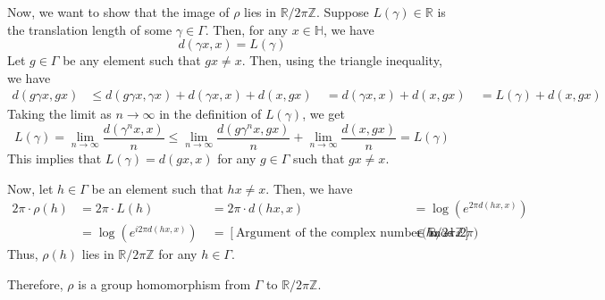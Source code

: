 \documentclass[12pt,a4paper,english]{article}
\theoremstyle{plain}
\theoremstyle{definition}
\theoremstyle{remark}
\begin{document}
Now, we want to show that the image of $\rho$ lies in $\mathbb{R}/2\pi\mathbb{Z}$. Suppose $L(\gamma) \in \mathbb{R}$ is the translation length of some $\gamma \in \Gamma$. Then, for any $x \in \mathbb{H}$, we have $$d(\gamma x, x) = L(\gamma)$$ Let $g \in \Gamma$ be any element such that $gx \neq x$. Then, using the triangle inequality, we have \begin{align} d(g\gamma x, gx) &\leq d(g\gamma x, \gamma x) + d(\gamma x, x) + d(x, gx) \ &= d(\gamma x, x) + d(x, gx) \ &= L(\gamma) + d(x, gx) \end{align} Taking the limit as $n \to \infty$ in the definition of $L(\gamma)$, we get $$L(\gamma) = \lim_{n \to \infty} \frac{d(\gamma^n x, x)}{n} \leq \lim_{n \to \infty} \frac{d(g\gamma^n x, gx)}{n} + \lim_{n \to \infty} \frac{d(x, gx)}{n} = L(\gamma)$$ This implies that $L(\gamma) = d(gx, x)$ for any $g \in \Gamma$ such that $gx \neq x$.

Now, let $h \in \Gamma$ be an element such that $hx \neq x$. Then, we have \begin{align} 2\pi \cdot \rho(h) &= 2\pi \cdot L(h) \ &= 2\pi \cdot d(hx, x) \ &= \log(e^{2\pi d(hx,x)}) \\
&= \log(e^{i2\pi d(hx,x)}) \ &= [\text{Argument of the complex number } hx - x] \pmod{2\pi} \ &\in \mathbb{R}/2\pi\mathbb{Z} \end{align} Thus, $\rho(h)$ lies in $\mathbb{R}/2\pi\mathbb{Z}$ for any $h \in \Gamma$.

Therefore, $\rho$ is a group homomorphism from $\Gamma$ to $\mathbb{R}/2\pi\mathbb{Z}$.
\end{document}
